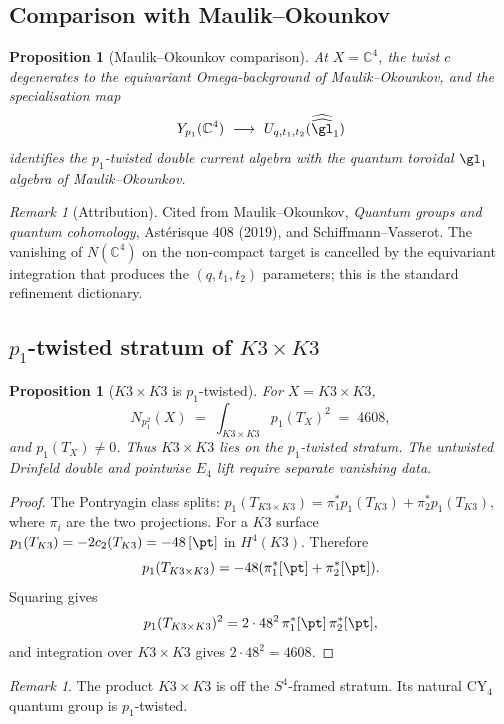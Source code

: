 \documentclass[11pt]{article}
\theoremstyle{plain}
\newtheorem{proposition}[theorem]{Proposition}
\theoremstyle{definition}
\theoremstyle{remark}
\newtheorem{remark}[theorem]{Remark}
\newcommand{\bC}{\mathbb{C}}
\begin{document}
\subsection{Comparison with Maulik--Okounkov}

\begin{proposition}[Maulik--Okounkov comparison]
\label{prop:cy4-MO-comparison}
At $X = \bC^4$, the twist $c$ degenerates to the equivariant
Omega-background of Maulik--Okounkov, and the specialisation map
\[
Y_{p_1}(\bC^4)\ \longrightarrow\ U_{q,t_1,t_2}(\widehat{\widehat{\gl}}_1)
\]
identifies the $p_1$-twisted double current algebra with the
quantum toroidal $\gl_1$ algebra of Maulik--Okounkov.
\end{proposition}

\begin{remark}[Attribution]
Cited from Maulik--Okounkov, \emph{Quantum groups and quantum
cohomology}, Ast\'erisque 408 (2019), and Schiffmann--Vasserot.
The vanishing of $N(\bC^4)$ on the non-compact target is cancelled by
the equivariant integration that produces the $(q,t_1,t_2)$
parameters; this is the standard refinement dictionary.
\end{remark}

\subsection{$p_1$-twisted stratum of $K3 \times K3$}

\begin{proposition}[$K3 \times K3$ is $p_1$-twisted]
\label{prop:k3k3-p1-twisted}
For $X = K3 \times K3$,
\[
N_{p_1^2}(X) \;=\; \int_{K3 \times K3} p_1(T_X)^2
\;=\; 4608,
\]
and $p_1(T_X)\neq0$. Thus $K3\times K3$ lies on the $p_1$-twisted
stratum.  The untwisted Drinfeld double and pointwise $E_4$ lift
require separate vanishing data.
\end{proposition}

\begin{proof}
The Pontryagin class splits: $p_1(T_{K3 \times K3}) = \pi_1^* p_1(T_{K3})
+ \pi_2^* p_1(T_{K3})$, where $\pi_i$ are the two projections.
For a $K3$ surface $p_1(T_{K3}) = -2 c_2(T_{K3}) = -48\,[\pt]$ in
$H^4(K3)$. Therefore
\[
p_1(T_{K3\times K3})
=-48(\pi_1^*[\pt]+\pi_2^*[\pt]).
\]
Squaring gives
\[
p_1(T_{K3\times K3})^2
=2\cdot48^2\,\pi_1^*[\pt]\,\pi_2^*[\pt],
\]
and integration over $K3\times K3$ gives $2\cdot48^2=4608$.
\end{proof}

\begin{remark}
The product $K3\times K3$ is off the $S^4$-framed stratum. Its
natural CY$_4$ quantum group is $p_1$-twisted.
\end{remark}
\end{document}
